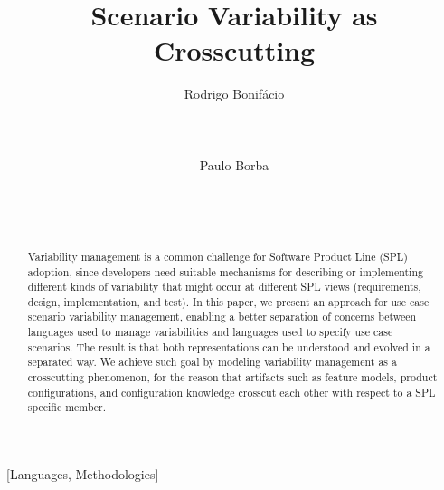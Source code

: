 \documentclass{acm_proc_article-sp}
\begin{document}
\lstset{language=Haskell, numbers=left,
numberstyle=\tiny,numbersep=5pt,basicstyle=\scriptsize,aboveskip=20pt}

\title{Scenario Variability as Crosscutting}



\author{
\alignauthor
Rodrigo Bonif\'{a}cio\\
       \\
       \\
       \\
\alignauthor
Paulo Borba\\
       \\
       \\
       \\
}

\maketitle              

\begin{abstract}
Variability management is a common challenge for Software Product
Line (SPL) adoption, since developers need suitable
mechanisms for describing or implementing different kinds of variability
that might occur at different SPL views (requirements, design,
implementation, and test). In this paper, we present an approach for
use case scenario variability management, enabling a better
separation of concerns between languages used to manage
variabilities and languages used to specify use case scenarios. The
result is that both representations can be understood and evolved in
a separated way. We achieve such goal by modeling variability management
as a crosscutting phenomenon, for the reason that artifacts such as feature models, 
product configurations, and configuration knowledge crosscut each 
other with respect to a SPL specific member. 
\end{abstract}

[Languages,
Methodologies]\


\end{document}
